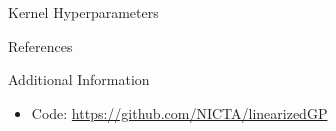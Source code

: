 \documentclass[final]{beamer}
\newlength{\onecolwid}
\begin{document}
\begin{frame}[t]
\begin{columns}[t]
\begin{column}{\onecolwid}
\begin{block}{Kernel Hyperparameters}
\end{block}






\begin{block}{References}

\small{
\vspace{0.75in}}

\end{block}









\begin{alertblock}{Additional Information}

\begin{itemize}
\item Code: \href{https://github.com/NICTA/linearizedGP}
                 {https://github.com/NICTA/linearizedGP}
\end{itemize}


\end{alertblock}
\end{column}
\end{columns}
\end{frame}
\end{document}
